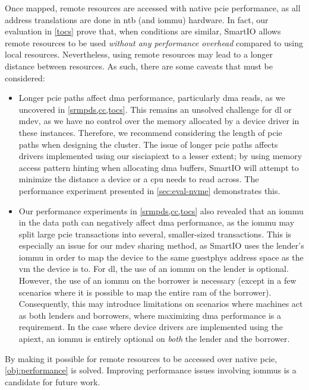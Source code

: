 Once mapped, remote resources are accessed with native \gls{pcie} performance, as all address translations are done in \gls{ntb} (and \gls{iommu}) hardware.
%
In fact, our evaluation in \cref{tocs} prove that, when conditions are similar, SmartIO allows remote resources to be used \emph{without any performance overhead} compared to using local resources.
%
Nevertheless, using remote resources may lead to a longer distance between resources.
%
As such, there are some caveats that must be considered:
%
\begin{itemize}
    \item Longer \gls{pcie} paths affect \gls{dma} performance, particularly \gls{dma} reads, as we uncovered in \cref{srmpds,cc,tocs}.
        This remains an unsolved challenge for \gls{dl} or \gls{mdev}, as we have no control over the memory allocated by a device driver in these instances.
        Therefore, we recommend considering the length of \gls{pcie} paths when designing the cluster.
        The issue of longer \gls{pcie} paths affects drivers implemented using our \gls{sisciapiext} to a lesser extent;
        by using memory access pattern hinting when allocating \gls{dma} buffers, SmartIO will attempt to minimize the distance a device or a \gls{cpu} needs to read across.
        The performance experiment presented in \cref{sec:eval-nvme} demonstrates this.


    \item Our performance experiments in \cref{srmpds,cc,tocs} also revealed that an \gls{iommu} in the data path can negatively affect \gls{dma} performance, as the \gls{iommu} may split large \gls{pcie} transactions into several, smaller-sized transactions.
        This is especially an issue for our \gls{mdev} sharing method, as SmartIO uses the \gls{lender}'s \gls{iommu} in order to map the device to the same \gls{guestphys} address space as the \gls{vm} the device is  to.
        For \gls{dl}, the use of an \gls{iommu} on the \gls{lender} is optional.
        However, the use of an \gls{iommu} on the \gls{borrower} is necessary (except in a few scenarios where it is possible to map the entire \gls{ram} of the \gls{borrower}). 
        Consequently, this may introduce limitations on scenarios where machines act as both \glspl{lender} and \glspl{borrower}, where maximizing \gls{dma} performance is a requirement.
        In the case where device drivers are implemented using the \gls{apiext}, an \gls{iommu} is entirely optional on \emph{both} the \gls{lender} and the \gls{borrower}.
\end{itemize}
%
By making it possible for remote resources to be accessed over native \gls{pcie}, \cref*{obj:performance} is solved.
%
Improving performance issues involving \glspl{iommu} is a candidate for future work.



